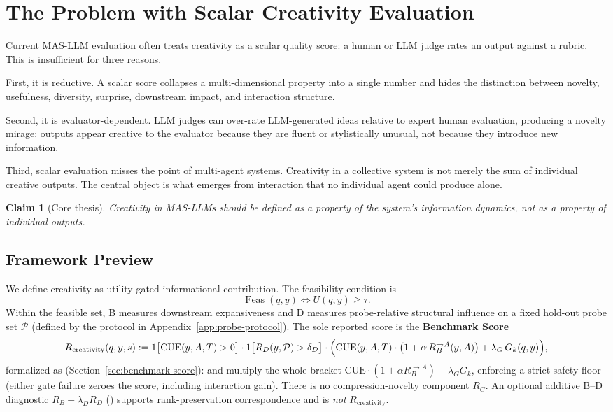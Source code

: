 \documentclass[11pt]{article}
\newtheorem{claim}{Claim}
\theoremstyle{remark}
\newcommand{\RewardB}{R_B}
\newcommand{\RewardD}{R_D}
\newcommand{\Feas}{\operatorname{Feas}}
\newcommand{\LeanName}[1]{\texttt{\detokenize{#1}}}
\begin{document}
\section{The Problem with Scalar Creativity Evaluation}

Current MAS-LLM evaluation often treats creativity as a scalar quality score:
a human or LLM judge rates an output against a rubric. This is insufficient for
three reasons.

First, it is reductive. A scalar score collapses a multi-dimensional property
into a single number and hides the distinction between novelty, usefulness,
diversity, surprise, downstream impact, and interaction structure.

Second, it is evaluator-dependent. LLM judges can over-rate LLM-generated ideas
relative to expert human evaluation, producing a novelty mirage: outputs appear
creative to the evaluator because they are fluent or stylistically unusual, not
because they introduce new information.

Third, scalar evaluation misses the point of multi-agent systems. Creativity in
a collective system is not merely the sum of individual creative outputs. The
central object is what emerges from interaction that no individual agent could
produce alone.

\begin{claim}[Core thesis]
Creativity in MAS-LLMs should be defined as a property of the system's
information dynamics, not as a property of individual outputs.
\end{claim}

\subsection*{Framework Preview}

We define creativity as utility-gated informational contribution. The
feasibility condition is
\[
  \Feas(q,y) \iff U(q,y)\ge \tau.
\]
Within the feasible set, B measures downstream expansiveness and D measures
probe-relative structural influence on a fixed hold-out probe set
$\mathcal{P}$ (defined by the protocol in
Appendix~\ref{app:probe-protocol}). The sole reported score is the
\textbf{Benchmark Score}
\begin{equation}
\label{eq:Rcreativity}
  R_{\mathrm{creativity}}(q,y,s)
  :=
  1\bigl[\mathrm{CUE}(y,A,T)>0\bigr]
  \cdot 1\bigl[\RewardD(y,\mathcal{P})>\delta_D\bigr]
  \cdot\Bigl(
    \mathrm{CUE}(y,A,T)\cdot\bigl(1+\alpha\,R_B^{\to A}(y,A)\bigr)
    +\lambda_G\,G_k(q,y)
  \Bigr),
\end{equation}
formalized as \LeanName{Rcreativity}
(Section~\ref{sec:benchmark-score}): \LeanName{cueGate} and
\LeanName{dGate} multiply the whole bracket
$\mathrm{CUE}\cdot(1+\alpha R_B^{\to A})+\lambda_G G_k$, enforcing a
strict safety floor (either gate failure zeroes the score, including
interaction gain). There is no compression-novelty component $R_C$. An
optional additive B--D diagnostic $\RewardB+\lambda_D\RewardD$
(\LeanName{benchmarkReward}) supports rank-preservation correspondence and
is \emph{not} $R_{\mathrm{creativity}}$.
\end{document}
